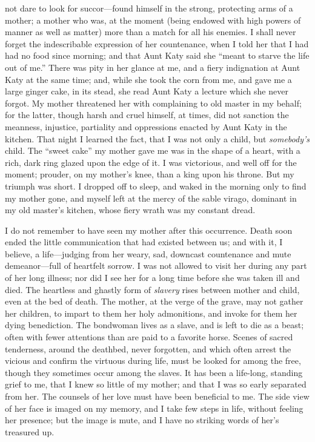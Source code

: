 not dare to look for succor---found himself in the strong, protecting
arms of a mother; a mother who was, at the moment (being endowed with
high powers of manner as well as matter) more than a match for all his
enemies. I shall never forget the indescribable expression of her
countenance, when I told her that I had had no food since morning; and
that Aunt Katy said she ``meant to starve the life out of me.'' There
was pity in her glance at me, and a fiery indignation at Aunt Katy at
the same time; and, while she took the corn from me, and gave me a large
ginger cake, in its stead, she read Aunt Katy a lecture which she never
forgot. My mother threatened her with complaining to old master in my
behalf; for the latter, though harsh and cruel himself, at times, did
not sanction the meanness, injustice, partiality and oppressions enacted
by Aunt Katy in the kitchen. That night I learned the fact, that I was
not only a child, but \emph{somebody's} child. The ``sweet cake'' my
mother gave me was in the shape of a heart, with a rich, dark ring
glazed upon the edge of it. I was victorious, and well off for the
moment; prouder, on my mother's knee, than a king upon his throne. But
my triumph was short. I dropped off to {}sleep, and waked in the morning
only to find my mother gone, and myself left at the mercy of the sable
virago, dominant in my old master's kitchen, whose fiery wrath was my
constant dread.

I do not remember to have seen my mother after this occurrence. Death
soon ended the little communication that had existed between us; and
with it, I believe, a life---judging from her weary, sad, downcast
countenance and mute demeanor---full of heartfelt sorrow. I was not
allowed to visit her during any part of her long illness; nor did I see
her for a long time before she was taken ill and died. The heartless and
ghastly form of \emph{slavery} rises between mother and child, even at
the bed of death. The mother, at the verge of the grave, may not gather
her children, to impart to them her holy admonitions, and invoke for
them her dying benediction. The bondwoman lives as a slave, and is left
to die as a beast; often with fewer attentions than are paid to a
favorite horse. Scenes of sacred tenderness, around the deathbed, never
forgotten, and which often arrest the vicious and confirm the virtuous
during life, must be looked for among the free, though they sometimes
occur among the slaves. It has been a life-long, standing grief to me,
that I knew so little of my mother; and that I was so early separated
from her. The counsels of her love must have been beneficial to me. The
side view of her face is imaged on my memory, and I take few steps in
life, without feeling her presence; but the image is mute, and I have no
striking words of her's treasured up.

